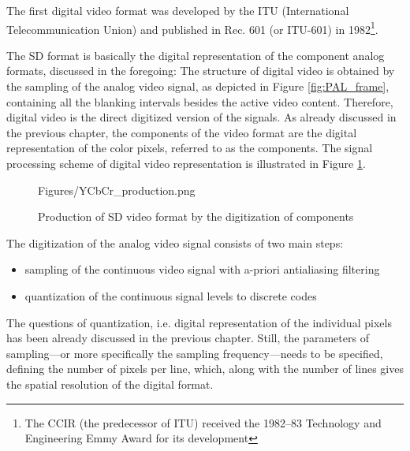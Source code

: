 The first digital video format was developed by the ITU (International Telecommunication Union) and published in Rec. 601 (or ITU-601) in 1982\footnote{The CCIR (the predecessor of ITU) received the 1982–83 Technology and Engineering Emmy Award for its development}.

The SD format is basically the digital representation of the component analog formats, discussed in the foregoing:
The structure of digital video is obtained by the sampling of the analog video signal, as depicted in Figure \ref{fig:PAL_frame}, containing all the blanking intervals besides the active video content.
Therefore, digital video is the direct digitized version of the \ypbpr signals.
As already discussed in the previous chapter, the components of the video format are the digital representation of the color pixels, referred to as the \ycbcr components.
The signal processing scheme of digital video representation is illustrated in Figure \ref{Fig:SD_production}.
\begin{figure}[]
	\centering
	\begin{overpic}[width = 0.8 \columnwidth ]{Figures/YCbCr_production.png}
	\end{overpic}
	\caption{Production of SD video format by the digitization of \ypbpr components}
	\label{Fig:SD_production}
\end{figure}

The digitization of the analog video signal consists of two main steps:
\begin{itemize}
\item sampling of the continuous video signal with a-priori antialiasing filtering
\item quantization of the continuous signal levels to discrete codes
\end{itemize}
The questions of quantization, i.e. digital representation of the individual pixels has been already discussed in the previous chapter.
Still, the parameters of sampling---or more specifically the sampling frequency---needs to be specified, defining the number of pixels per line, which, along with the number of lines gives the spatial resolution of the digital format.

